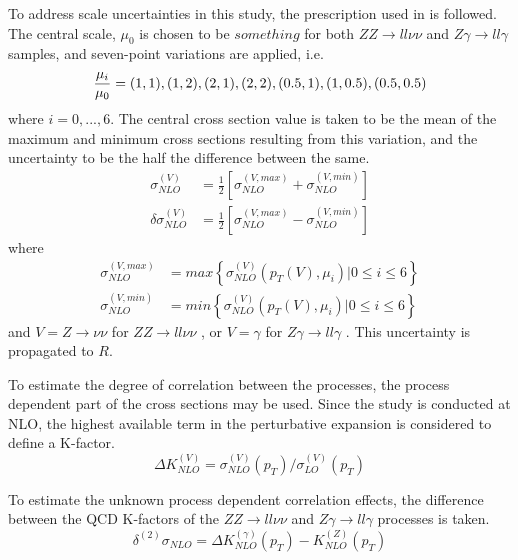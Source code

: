 \documentclass[11pt,a4paper]{report}
\newcommand{\ZZ}{$ZZ\to ll\nu\nu$ }
\newcommand{\Zg}{$Z\gamma\to ll\gamma$ }
\begin{document}
To address scale uncertainties in this study, the prescription used in \cite{precise_scale} is followed. The central scale, $\mu_0$ is chosen to be $something$ for both \ZZ and \Zg samples, and seven-point variations are applied, i.e.
\begin{equation}
\frac{\mu_i}{\mu_0} = (1,1),(1,2),(2,1),(2,2),(0.5,1),(1,0.5),(0.5,0.5)\\
\label{eq:scale}
\end{equation}
where $i=0,...,6$. The central cross section value is taken to be the mean of the maximum and minimum cross sections resulting from this variation, and the uncertainty to be the half the difference between the same.
\begin{align}
\sigma_{NLO}^{(V)} &= \frac{1}{2}\left[\sigma_{NLO}^{(V,max)} + \sigma_{NLO}^{(V,min)}\right]\\
\delta\sigma_{NLO}^{(V)} &= \frac{1}{2}\left[\sigma_{NLO}^{(V,max)} - \sigma_{NLO}^{(V,min)}\right]
\label{eq:scale_central}
\end{align}
where
\begin{equation}
\begin{split}
\sigma_{NLO}^{(V,max)} &= max\left\lbrace\sigma_{NLO}^{(V)}(p_{T}(V),\mu_i)|0\leq i \leq 6\right\rbrace\\
\sigma_{NLO}^{(V,min)} &= min\left\lbrace\sigma_{NLO}^{(V)}(p_{T}(V),\mu_i)|0\leq i \leq 6\right\rbrace
\end{split}
\end{equation}
and $V = Z\to\nu\nu$ for \ZZ, or $V = \gamma$ for \Zg. This uncertainty is propagated to $R$.

To estimate the degree of correlation between the processes, the process dependent part of the cross sections may be used. Since the study is conducted at NLO, the highest available term in the perturbative expansion is considered to define a K-factor.
\begin{equation}
\Delta K_{NLO}^{(V)} = \sigma_{NLO}^{(V)}(p_T)/\sigma_{LO}^{(V)}(p_T)
\label{eq:K_factor}
\end{equation}

To estimate the unknown process dependent correlation effects, the difference between the QCD K-factors of the \ZZ and \Zg processes is taken.
\begin{equation}
\delta^{(2)} \sigma_{NLO} = \Delta K_{NLO}^{(\gamma)}(p_T) - K_{NLO}^{(Z)}(p_T)
\label{eq:K_factor_unc}
\end{equation}
\end{document}
